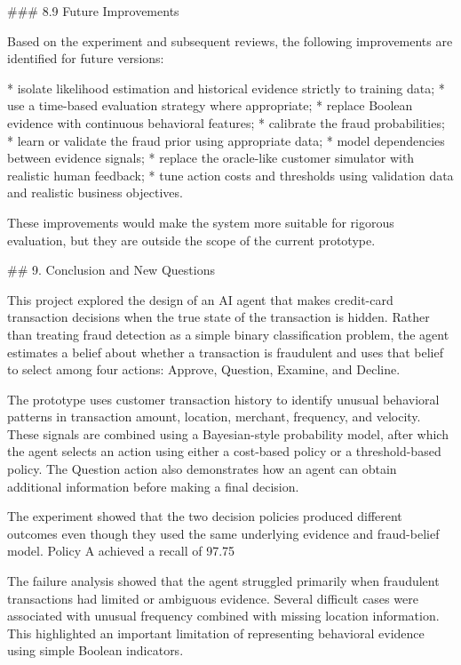 ### 8.9 Future Improvements

Based on the experiment and subsequent reviews, the following improvements are identified for future versions:

* isolate likelihood estimation and historical evidence strictly to training data;
* use a time-based evaluation strategy where appropriate;
* replace Boolean evidence with continuous behavioral features;
* calibrate the fraud probabilities;
* learn or validate the fraud prior using appropriate data;
* model dependencies between evidence signals;
* replace the oracle-like customer simulator with realistic human feedback;
* tune action costs and thresholds using validation data and realistic business objectives.

These improvements would make the system more suitable for rigorous evaluation, but they are outside the scope of the current prototype.

## 9. Conclusion and New Questions

This project explored the design of an AI agent that makes credit-card transaction decisions when the true state of the transaction is hidden. Rather than treating fraud detection as a simple binary classification problem, the agent estimates a belief about whether a transaction is fraudulent and uses that belief to select among four actions: Approve, Question, Examine, and Decline.

The prototype uses customer transaction history to identify unusual behavioral patterns in transaction amount, location, merchant, frequency, and velocity. These signals are combined using a Bayesian-style probability model, after which the agent selects an action using either a cost-based policy or a threshold-based policy. The Question action also demonstrates how an agent can obtain additional information before making a final decision.

The experiment showed that the two decision policies produced different outcomes even though they used the same underlying evidence and fraud-belief model. Policy A achieved a recall of 97.75%

The failure analysis showed that the agent struggled primarily when fraudulent transactions had limited or ambiguous evidence. Several difficult cases were associated with unusual frequency combined with missing location information. This highlighted an important limitation of representing behavioral evidence using simple Boolean indicators.

